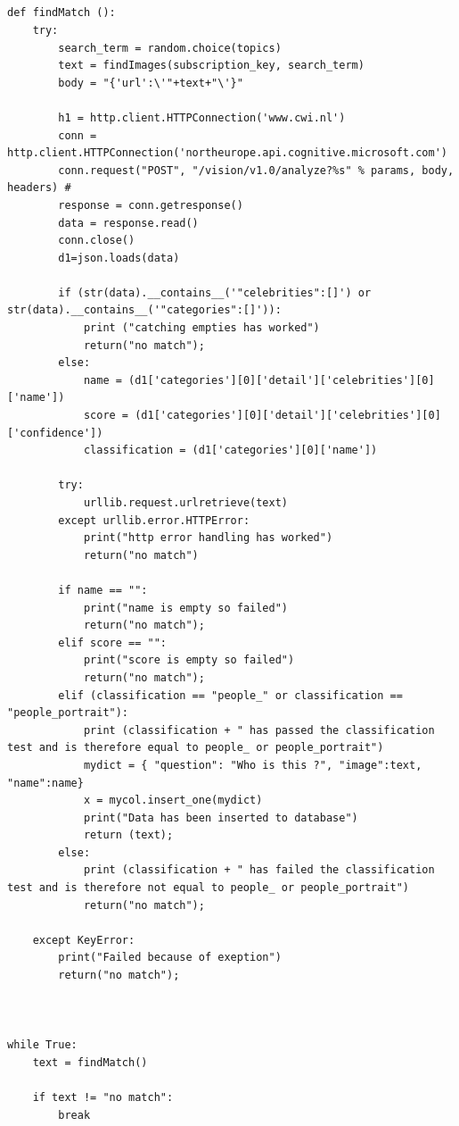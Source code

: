 \documentclass[12pt,a4paper]{article}
\begin{document}
\begin{appendices}
\begin{lstlisting}
    



def findMatch (): 
    try:    
        search_term = random.choice(topics) 
        text = findImages(subscription_key, search_term)  
        body = "{'url':\'"+text+"\'}" 
 
        h1 = http.client.HTTPConnection('www.cwi.nl')
        conn = http.client.HTTPConnection('northeurope.api.cognitive.microsoft.com') 
        conn.request("POST", "/vision/v1.0/analyze?%s" % params, body, headers) #
        response = conn.getresponse() 
        data = response.read() 
        conn.close() 
        d1=json.loads(data)  
            
        if (str(data).__contains__('"celebrities":[]') or str(data).__contains__('"categories":[]')):  
            print ("catching empties has worked")
            return("no match");    
        else:  
            name = (d1['categories'][0]['detail']['celebrities'][0]['name']) 
            score = (d1['categories'][0]['detail']['celebrities'][0]['confidence']) 
            classification = (d1['categories'][0]['name'])  
                  
        try:
            urllib.request.urlretrieve(text) 
        except urllib.error.HTTPError:  
            print("http error handling has worked")
            return("no match")    
        
        if name == "":  
            print("name is empty so failed")
            return("no match");  
        elif score == "":  
            print("score is empty so failed")
            return("no match");  
        elif (classification == "people_" or classification == "people_portrait"):   
            print (classification + " has passed the classification test and is therefore equal to people_ or people_portrait") 
            mydict = { "question": "Who is this ?", "image":text, "name":name} 
            x = mycol.insert_one(mydict) 
            print("Data has been inserted to database")
            return (text);  
        else:  
            print (classification + " has failed the classification test and is therefore not equal to people_ or people_portrait")
            return("no match");
            
    except KeyError:   
        print("Failed because of exeption")
        return("no match");  
    


while True:  
    text = findMatch()
        
    if text != "no match": 
        break   
    

\end{lstlisting}
\end{appendices}
\end{document}
